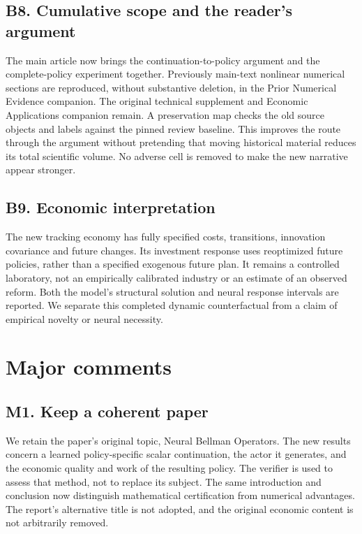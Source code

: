 \subsection*{B8. Cumulative scope and the reader's argument}
The main article now brings the continuation-to-policy argument and the
complete-policy experiment together. Previously main-text nonlinear
numerical sections are reproduced, without substantive deletion, in the
Prior Numerical Evidence companion. The original technical supplement and
Economic Applications companion remain. A preservation map checks the old
source objects and labels against the pinned review baseline. This improves
the route through the argument without pretending that moving historical
material reduces its total scientific volume. No adverse cell is removed
to make the new narrative appear stronger.

\subsection*{B9. Economic interpretation}
The new tracking economy has fully specified costs, transitions, innovation
covariance and future changes. Its investment response uses reoptimized
future policies, rather than a specified exogenous future plan. It remains
a controlled laboratory, not an empirically calibrated industry or an
estimate of an observed reform. Both the model's structural solution and
neural response intervals are reported. We separate this completed dynamic
counterfactual from a claim of empirical novelty or neural necessity.

\section*{Major comments}
\subsection*{M1. Keep a coherent paper}
We retain the paper's original topic, Neural Bellman Operators. The new
results concern a learned policy-specific scalar continuation, the actor
it generates, and the economic quality and work of the resulting policy.
The verifier is used to assess that method, not to replace its subject.
The same introduction and conclusion now distinguish mathematical
certification from numerical advantages. The report's alternative title is
not adopted, and the original economic content is not arbitrarily removed.

